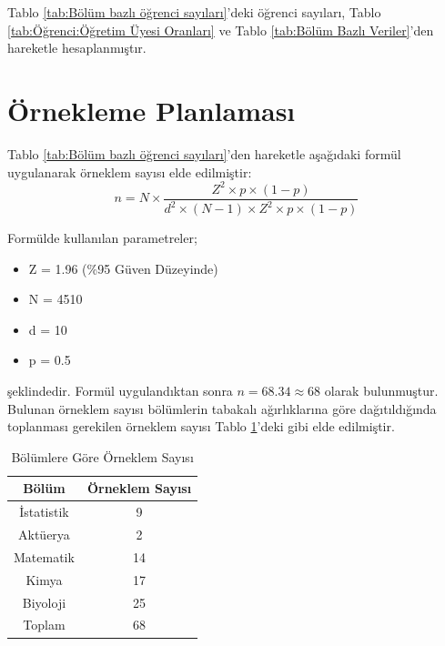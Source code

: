 \documentclass{article}
\begin{document}
Tablo \ref{tab:Bölüm bazlı öğrenci sayıları}'deki öğrenci sayıları, Tablo \ref{tab:Öğrenci:Öğretim Üyesi Oranları} ve Tablo \ref{tab:Bölüm Bazlı Veriler}'den hareketle hesaplanmıştır. 


\section{Örnekleme Planlaması}
Tablo \ref{tab:Bölüm bazlı öğrenci sayıları}'den hareketle aşağıdaki formül uygulanarak örneklem sayısı elde edilmiştir:
$$
n = N \times \frac{Z^2 \times p \times (1-p)}{d^2 \times (N-1) \times Z^2 \times p \times (1-p)}
$$

Formülde kullanılan parametreler;
\begin{itemize}
    \item Z = 1.96 (\%95 Güven Düzeyinde)
    \item N = 4510
    \item d = 10
    \item p = 0.5
\end{itemize} şeklindedir. Formül uygulandıktan sonra $n=68.34 \approx 68$ olarak bulunmuştur. Bulunan örneklem sayısı bölümlerin tabakalı ağırlıklarına göre dağıtıldığında toplanması gerekilen örneklem sayısı Tablo \ref{tab:ağırlıklandırılmış örneklem}'deki gibi elde edilmiştir.

\begin{table}[h]
    \centering
    \caption{Bölümlere Göre Örneklem Sayısı}
    \label{tab:ağırlıklandırılmış örneklem}
    \begin{tabular}{|c|c|}
         \hline
         Bölüm & Örneklem Sayısı \\
         \hline
         İstatistik & 9 \\
         Aktüerya & 2 \\
         Matematik & 14 \\
         Kimya & 17 \\
         Biyoloji & 25 \\
         \hline
         Toplam & 68 \\
         \hline
    \end{tabular}
\end{table}
\end{document}
